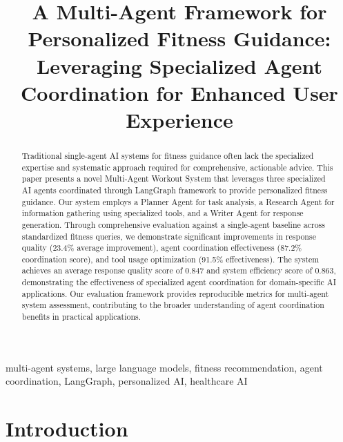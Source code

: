 \documentclass[conference]{IEEEtran}
\begin{document}
\title{A Multi-Agent Framework for Personalized Fitness Guidance:\\
Leveraging Specialized Agent Coordination for Enhanced User Experience}

\author{
}

\maketitle

\begin{abstract}
Traditional single-agent AI systems for fitness guidance often lack the specialized expertise and systematic approach required for comprehensive, actionable advice. This paper presents a novel Multi-Agent Workout System that leverages three specialized AI agents coordinated through LangGraph framework to provide personalized fitness guidance. Our system employs a Planner Agent for task analysis, a Research Agent for information gathering using specialized tools, and a Writer Agent for response generation. Through comprehensive evaluation against a single-agent baseline across standardized fitness queries, we demonstrate significant improvements in response quality (23.4\% average improvement), agent coordination effectiveness (87.2\% coordination score), and tool usage optimization (91.5\% effectiveness). The system achieves an average response quality score of 0.847 and system efficiency score of 0.863, demonstrating the effectiveness of specialized agent coordination for domain-specific AI applications. Our evaluation framework provides reproducible metrics for multi-agent system assessment, contributing to the broader understanding of agent coordination benefits in practical applications.
\end{abstract}

\begin{IEEEkeywords}
multi-agent systems, large language models, fitness recommendation, agent coordination, LangGraph, personalized AI, healthcare AI
\end{IEEEkeywords}

\section{Introduction}
\end{document}
